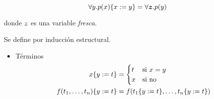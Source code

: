 \[
    \forall y . p(x)\{x := y\} =
    \forall \bm{z} . p(y)
\]

donde $z$ es una variable \textit{fresca}.

\begin{definition}
    \label{nd:def:subst}
    Se define por inducción estructural.
    \begin{itemize}
        \item Términos
        \begin{align*}
            x\{y := t\} &= \begin{cases}
                t &\text{si } x = y\\
                x &\text{si no}
            \end{cases}\\
            f(t_1, \dots, t_n)\{y := t\} &=
                f(
                    t_1\{y := t\},
                    \dots,
                    t_n\{y := t\}
                )
        \end{align*}


\end{itemize}
\end{definition}

